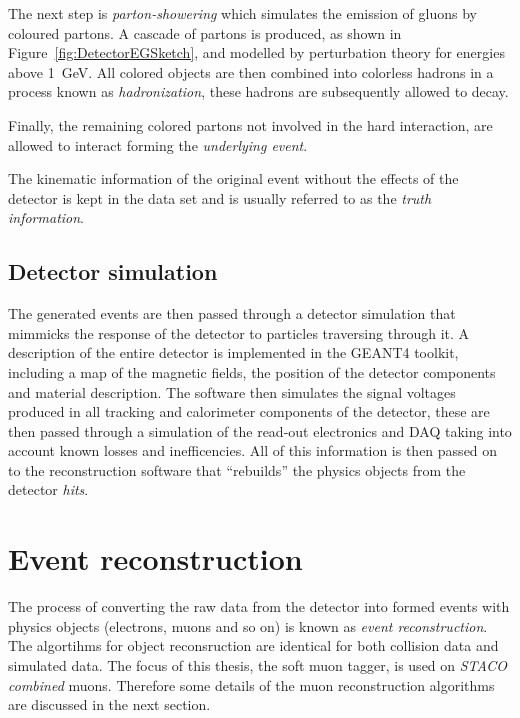 The next step is \emph{parton-showering} which simulates the  emission of gluons by coloured partons. A cascade of partons is produced, as shown in Figure~\ref{fig:DetectorEGSketch}, and modelled by perturbation theory for energies above \SI{1}{GeV}. All colored objects are then combined into colorless hadrons in a process known as \emph{hadronization}, these hadrons are subsequently allowed to decay.

Finally, the remaining colored partons not involved in the hard interaction, are allowed to interact forming the \emph{underlying event}.

The kinematic information of the original event without the effects of the detector is kept in the data set and is usually referred to as the \emph{truth information}.

\subsection{Detector simulation} \label{sec:DetectorSimulation}

The generated events are then passed through a detector simulation that mimmicks the response of the detector to particles traversing through it. A description of the entire detector is implemented in the GEANT4 toolkit, including a map of the magnetic fields, the position of the detector components and material description. The software then simulates the signal voltages produced in all tracking and calorimeter components of the detector, these are then passed through a simulation of the read-out electronics and DAQ taking into account known losses and inefficencies. All of this information is then passed on to the reconstruction software that ``rebuilds'' the physics objects from the detector \emph{hits}.

\section{Event reconstruction} \label{sec:DetectorEventReco}

The process of converting the raw data from the detector into formed events with physics objects (electrons, muons and so on) is known as \emph{event reconstruction}. The algortihms for object reconsruction are identical for both collision data and simulated data. The focus of this thesis, the soft muon tagger, is used on \emph{STACO combined} muons. Therefore some details of the muon reconstruction algorithms are discussed in the next section.

